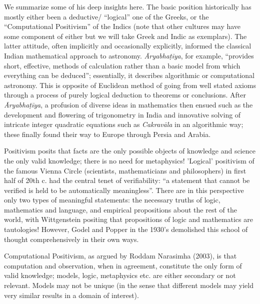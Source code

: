 {We summarize some of his deep insights here. The basic position historically has mostly either been a deductive/ “logical” one of the Greeks, or the “Computational Positivism” of the Indics (note that other cultures may have some component of either but we will take Greek and Indic as exemplars). The latter attitude, often implicitly and occasionally explicitly, informed the classical Indian mathematical approach to astronomy. \textsl{Āryabhaṭīya}, for example, “provides short, effective, methods of calculation rather than a basic model from which everything can be deduced”; essentially, it describes algorithmic or computational astronomy. This is opposite of Euclidean method of going from well stated axioms through a process of purely logical deduction to theorems or conclusions. After \textsl{Āryabhaṭīya}, a profusion of diverse ideas in mathematics then ensued such as the development and flowering of trigonometry in India and innovative solving of intricate integer quadratic equations such as \textsl{Cakravāla} in an algorithmic way; these finally found their way to Europe through Persia and Arabia.

Positivism posits that facts are the only possible objects of knowledge and science the only valid knowledge; there is no need for metaphysics! 'Logical' positivism of the famous Vienna Circle (scientists, mathematicians and philosophers) in first half of 20th c. had the central tenet of verifiability: “a statement that cannot be verified is held to be automatically meaningless”. There are in this perspective only two types of meaningful statements: the necessary truths of logic, mathematics and language, and empirical propositions about the rest of the world, with Wittgenstein positing that propositions of logic and mathematics are tautologies! However, Godel and Popper in the 1930’s demolished this school of thought comprehensively in their own ways. 

Computational Positivism, as argued by Roddam Narasimha (2003), is that computation and observation, when in agreement, constitute the only form of valid knowledge; models, logic, metaphysics etc. are either secondary or not relevant. Models may not be unique (in the sense that different models may yield very similar results in a domain of interest).

}
